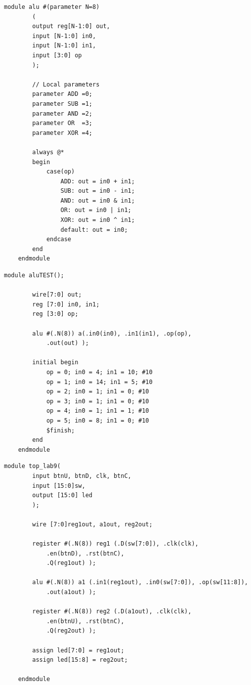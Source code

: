 \documentclass[11pt]{article}
\begin{document}
\clearpage
\begin{lstlisting}[style=Verilog,
caption=ALU Source Code,
label=MUX w/ four inputs Source Code
]
	module alu #(parameter N=8) 
		( 
		output reg[N-1:0] out,
		input [N-1:0] in0,
		input [N-1:0] in1,
		input [3:0] op 
		);
		
		// Local parameters
		parameter ADD =0; 
		parameter SUB =1; 
		parameter AND =2; 
		parameter OR  =3; 
		parameter XOR =4;
		
		always @* 
		begin 
			case(op)
				ADD: out = in0 + in1;
				SUB: out = in0 - in1;
				AND: out = in0 & in1;
				OR: out = in0 | in1;
				XOR: out = in0 ^ in1;
				default: out = in0;
			endcase
		end
	endmodule
\end{lstlisting}

\begin{lstlisting}[style=Verilog,
caption=ALU Test,
label=MUX4 Test
]
	module aluTEST();
	
		wire[7:0] out;
		reg [7:0] in0, in1;
		reg [3:0] op;
		
		alu #(.N(8)) a(.in0(in0), .in1(in1), .op(op),
			.out(out) );
		
		initial begin
			op = 0; in0 = 4; in1 = 10; #10			
			op = 1; in0 = 14; in1 = 5; #10			
			op = 2; in0 = 1; in1 = 0; #10			
			op = 3; in0 = 1; in1 = 0; #10
			op = 4; in0 = 1; in1 = 1; #10
			op = 5; in0 = 8; in1 = 0; #10
			$finish;  
		end          
	endmodule
\end{lstlisting}
\clearpage
\begin{lstlisting}[style=Verilog,
caption=Top Level Source Code,
label=Anode Decoder Source Code
]
	module top_lab9(
		input btnU, btnD, clk, btnC,
		input [15:0]sw,
		output [15:0] led
		);
	
		wire [7:0]reg1out, a1out, reg2out;
		
		register #(.N(8)) reg1 (.D(sw[7:0]), .clk(clk),
			.en(btnD), .rst(btnC),
			.Q(reg1out) ); 
		
		alu #(.N(8)) a1 (.in1(reg1out), .in0(sw[7:0]), .op(sw[11:8]),
			.out(a1out) ); 
		
		register #(.N(8)) reg2 (.D(a1out), .clk(clk),
			.en(btnU), .rst(btnC),
			.Q(reg2out) );
			
		assign led[7:0] = reg1out;
		assign led[15:8] = reg2out;
	
	endmodule
\end{lstlisting}
\end{document}

